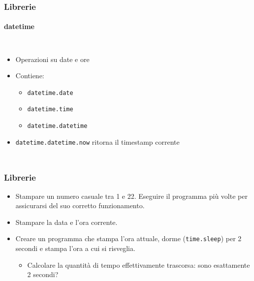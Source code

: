 \begin{contentframe}
    \frametitle{Librerie}
    \framesubtitle{datetime}

    \begin{columns}
        \begin{itemize}
            \item Operazioni su date e ore
            \bigskip
            \item Contiene:
            \begin{itemize}
                \item \texttt{datetime.date}
                \item \texttt{datetime.time}
                \item \texttt{datetime.datetime}
            \end{itemize}
            \bigskip
            \item \texttt{datetime.datetime.now} ritorna il timestamp corrente 
        \end{itemize}
        
        \centering
    \end{columns}
\end{contentframe}

\begin{exerciseframe}
    \frametitle{Librerie}

    \begin{itemize}
        \item Stampare un numero casuale tra 1 e 22. Eseguire il programma più volte per assicurarsi del suo corretto funzionamento.

        \pause
        \bigskip
        \item Stampare la data e l'ora corrente.

        \pause
        \bigskip
        \item Creare un programma che stampa l'ora attuale, dorme (\texttt{time.sleep}) per 2 secondi e stampa l'ora a cui si risveglia.
        \pause
        \begin{itemize}
            \item Calcolare la quantità di tempo effettivamente trascorsa: sono esattamente 2 secondi?
        \end{itemize}
        
    \end{itemize}
\end{exerciseframe}

